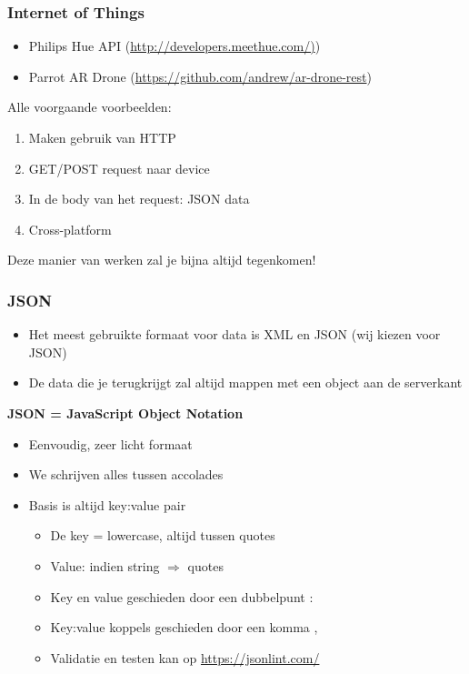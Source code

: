 \documentclass{article}
\newcommand{\bold}[1]{\textbf{#1}}
\begin{document}
\subsubsection{Internet of Things}
\begin{itemize}
    \item Philips Hue API (\url{http://developers.meethue.com/)})
    \item Parrot AR Drone (\url{https://github.com/andrew/ar-drone-rest})
\end{itemize}

Alle voorgaande voorbeelden:
\begin{enumerate}
    \item Maken gebruik van HTTP
    \item GET/POST request naar device
    \item In de body van het request: JSON data
    \item Cross-platform
\end{enumerate}

Deze manier van werken zal je bijna altijd tegenkomen!

\subsubsection{JSON}

\begin{itemize}
    \item Het meest gebruikte formaat voor data is XML en JSON (wij kiezen voor JSON)
    \item De data die je terugkrijgt zal altijd mappen met een object aan de serverkant
\end{itemize}

\bold{JSON = JavaScript Object Notation}

\begin{itemize}
    \item Eenvoudig, zeer licht formaat
    \item We schrijven alles tussen accolades
    \item Basis is altijd key:value pair
    \begin{itemize}
        \item De key = lowercase, altijd tussen quotes
        \item Value: indien string $\Rightarrow$ quotes
        \item Key en value geschieden door een dubbelpunt :
        \item Key:value koppels geschieden door een komma ,
    \end{itemize}
    \begin{itemize}
        \item Validatie en testen kan op \url{https://jsonlint.com/}
    \end{itemize}
\end{itemize}
\end{document}
